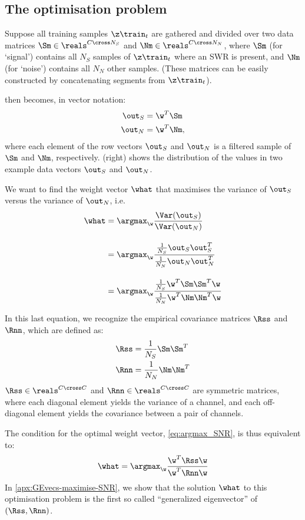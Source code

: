 \subsection{The optimisation problem}

Suppose all training samples $\z\train_t$ are gathered and divided over two data matrices $\Sm \in \reals^{C \cross N_S}$ and $\Nm \in \reals^{C \cross N_N}$, where $\Sm$ (for `signal') contains all $N_S$ samples of $\z\train_t$ where an SWR is present, and $\Nm$ (for `noise') contains all $N_N$ other samples. (These matrices can be easily constructed by concatenating segments from $\z\train_t$).

 then becomes, in vector notation:
%
\begin{align*}
\out_S &= \w^T \Sm \\
\out_N &= \w^T \Nm,
\end{align*}
where each element of the row vectors $\out_S$ and $\out_N$ is a filtered sample of $\Sm$ and $\Nm$, respectively.  (right) shows the distribution of the values in two example data vectors $\out_S$ and $\out_N$.

We want to find the weight vector $\what$ that maximises the variance of $\out_S$ versus the variance of $\out_N$, i.e.
%
\begin{align}
\what &= \argmax_{\w} \frac{\Var(\out_S)}
                           {\Var(\out_N)}  \label{eq:argmax_SNR} \\[1em]
      &= \argmax_{\w} 
         \frac{\frac{1}{N_S} \out_S \out_S^T}
              {\frac{1}{N_N} \out_N \out_N^T}   \nonumber \\[1em]
      &= \argmax_{\w}
         \frac{\frac{1}{N_S} \w^T \Sm \Sm^T \w}
              {\frac{1}{N_N} \w^T \Nm \Nm^T \w}  \nonumber
\end{align}

In this last equation, we recognize the empirical covariance matrices $\Rss$ and $\Rnn$, which are defined as:
%
\begin{align}
\Rss &= \frac{1}{N_S} \Sm \Sm^T \label{eq:covariance_S}\\
\Rnn &= \frac{1}{N_N} \Nm \Nm^T \label{eq:covariance_N}
\end{align}
%
$\Rss \in \reals^{C \cross C}$ and $\Rnn \in \reals^{C \cross C}$ are symmetric matrices, where each diagonal element yields the variance of a channel, and each off-diagonal element yields the covariance between a pair of channels.

The condition for the optimal weight vector, \cref{eq:argmax_SNR}, is thus equivalent to:
%
\begin{equation}
\label{eq:argmax_R}
\what = \argmax_{\w} \frac{\w^T \Rss \w}
                          {\w^T \Rnn \w}
\end{equation}
%
In \cref{apx:GEvecs-maximise-SNR}, we show that the solution $\what$ to this optimisation problem is the first so called ``generalized eigenvector'' of $(\Rss, \Rnn)$.
